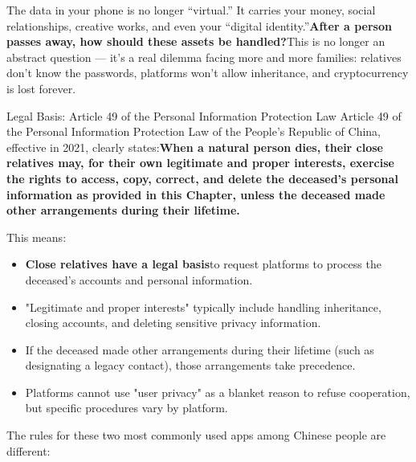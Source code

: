 
The data in your phone is no longer “virtual.” It carries your money, social relationships, creative works, and even your “digital identity.”\textbf{After a person passes away, how should these assets be handled?}This is no longer an abstract question — it's a real dilemma facing more and more families: relatives don't know the passwords, platforms won't allow inheritance, and cryptocurrency is lost forever.

\begin{tcbinfo}{Legal Basis: Article 49 of the Personal Information Protection Law}
Article 49 of the Personal Information Protection Law of the People's Republic of China, effective in 2021, clearly states:\textbf{When a natural person dies, their close relatives may, for their own legitimate and proper interests, exercise the rights to access, copy, correct, and delete the deceased's personal information as provided in this Chapter, unless the deceased made other arrangements during their lifetime.}

This means:

\begin{itemize}
  \item \textbf{Close relatives have a legal basis}to request platforms to process the deceased's accounts and personal information.
  \item "Legitimate and proper interests" typically include handling inheritance, closing accounts, and deleting sensitive privacy information.
  \item If the deceased made other arrangements during their lifetime (such as designating a legacy contact), those arrangements take precedence.
  \item Platforms cannot use "user privacy" as a blanket reason to refuse cooperation, but specific procedures vary by platform.
\end{itemize}

\end{tcbinfo}


The rules for these two most commonly used apps among Chinese people are different:

